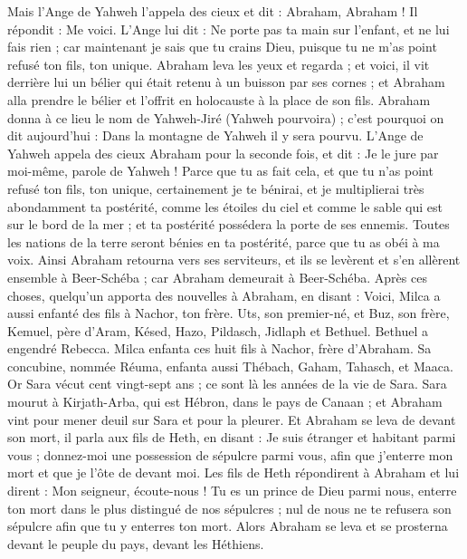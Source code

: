 \begin{multicols}{2}
Mais l'Ange de Yahweh l'appela des cieux et dit : Abraham, Abraham ! Il répondit : Me voici.
L'Ange lui dit : Ne porte pas ta main sur l'enfant, et ne lui fais rien ; car maintenant je sais que tu crains Dieu, puisque tu ne m'as point refusé ton fils, ton unique.
Abraham leva les yeux et regarda ; et voici, il vit derrière lui un bélier qui était retenu à un buisson par ses cornes ; et Abraham alla prendre le bélier et l'offrit en holocauste à la place de son fils.
Abraham donna à ce lieu le nom de Yahweh-Jiré (Yahweh pourvoira) ; c'est pourquoi on dit aujourd'hui : Dans la montagne de Yahweh il y sera pourvu.
L'Ange de Yahweh appela des cieux Abraham pour la seconde fois,
et dit : Je le jure par moi-même, parole de Yahweh ! Parce que tu as fait cela, et que tu n'as point refusé ton fils, ton unique,
certainement je te bénirai, et je multiplierai très abondamment ta postérité, comme les étoiles du ciel et comme le sable qui est sur le bord de la mer ; et ta postérité possédera la porte de ses ennemis.
Toutes les nations de la terre seront bénies en ta postérité, parce que tu as obéi à ma voix.
Ainsi Abraham retourna vers ses serviteurs, et ils se levèrent et s'en allèrent ensemble à Beer-Schéba ; car Abraham demeurait à Beer-Schéba.
Après ces choses, quelqu'un apporta des nouvelles à Abraham, en disant : Voici, Milca a aussi enfanté des fils à Nachor, ton frère.
Uts, son premier-né, et Buz, son frère, Kemuel, père d'Aram,
Késed, Hazo, Pildasch, Jidlaph et Bethuel.
Bethuel a engendré Rebecca. Milca enfanta ces huit fils à Nachor, frère d'Abraham.
Sa concubine, nommée Réuma, enfanta aussi Thébach, Gaham, Tahasch, et Maaca.
\VerseOne{}Or Sara vécut cent vingt-sept ans ; ce sont là les années de la vie de Sara.
Sara mourut à Kirjath-Arba, qui est Hébron, dans le pays de Canaan ; et Abraham vint pour mener deuil sur Sara et pour la pleurer.
Et Abraham se leva de devant son mort, il parla aux fils de Heth, en disant :
Je suis étranger et habitant parmi vous ; donnez-moi une possession de sépulcre parmi vous, afin que j'enterre mon mort et que je l'ôte de devant moi.
Les fils de Heth répondirent à Abraham et lui dirent :
Mon seigneur, écoute-nous ! Tu es un prince de Dieu parmi nous, enterre ton mort dans le plus distingué de nos sépulcres ; nul de nous ne te refusera son sépulcre afin que tu y enterres ton mort.
Alors Abraham se leva et se prosterna devant le peuple du pays, devant les Héthiens.

\end{multicols}
